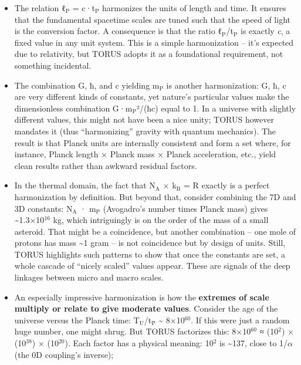 \documentclass[]{article}
\newcommand{\subscript}[1]{\ensuremath{_{\mathrm{#1}}}}
\newcommand{\superscript}[1]{\ensuremath{^{\mathrm{#1}}}}
\begin{document}
\begin{itemize}
\item
  The relation
  ℓ\subscript{P} =
  c·t\subscript{P}
  harmonizes the units of length and time. It ensures that the
  fundamental spacetime scales are tuned such that the speed of light is
  the conversion factor. A consequence is that the ratio
  ℓ\subscript{P}/t\subscript{P}
  is exactly \emph{c}, a fixed value in any unit system. This is a
  simple harmonization -- it's expected due to relativity, but TORUS
  adopts it as a foundational requirement, not something incidental.
\item
  The combination G, ħ, and c yielding
  m\subscript{P} is another
  harmonization: G, ħ, c are very different kinds of constants, yet
  nature's particular values make the dimensionless combination
  G·m\subscript{P}²/(ħc)
  equal to 1​. In a universe with slightly different values, this might
  not have been a nice unity; TORUS however mandates it (thus
  ``harmonizing'' gravity with quantum mechanics). The result is that
  Planck units are internally consistent and form a set where, for
  instance, Planck length × Planck mass × Planck acceleration, etc.,
  yield clean results rather than awkward residual factors.
\item
  In the thermal domain, the fact that
  N\subscript{A} ×
  k\subscript{B} = R
  exactly is a perfect harmonization by definition. But beyond that,
  consider combining the 7D and 3D constants:
  N\subscript{A} ·
  m\subscript{P}
  (Avogadro's number times Planck mass) gives
  \textasciitilde{}1.3×10\superscript{16} kg​, which intriguingly is on the order
  of the mass of a small asteroid. That might be a coincidence, but
  another combination -- one mole of protons has mass \textasciitilde{}1
  gram -- is not coincidence but by design of units. Still, TORUS
  highlights such patterns to show that once the constants are set, a
  whole cascade of ``nicely scaled'' values appear. These are signals of
  the deep linkages between micro and macro scales.
\item
  An especially impressive harmonization is how the \textbf{extremes of
  scale multiply or relate to give moderate values}. Consider the age of
  the universe versus the Planck time:
  T\subscript{U}/t\subscript{P}
  \textasciitilde{} 8×10\superscript{60}. If this were just a random huge number,
  one might shrug. But TORUS factorizes this: 8×10\superscript{60} ≈ (10\superscript{2}) ×
  (10\superscript{38}) × (10\superscript{20})​. Each factor has a physical meaning: 10\superscript{2}
  is \textasciitilde{}137, close to 1/$\alpha$ (the 0D coupling's inverse)​;

\end{itemize}
\end{document}

